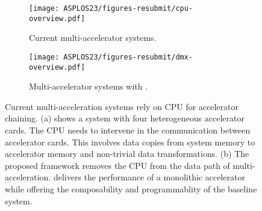 \begin{figure}[t]
\centering
\begin{subfigure}[b]{\columnwidth}
\texttt{[image: ASPLOS23/figures-resubmit/cpu-overview.pdf]}
\caption{Current multi-accelerator systems.}
\label{fig:overview:current}
\end{subfigure}
%
\hspace{0.5in}
\begin{subfigure}[b]{\columnwidth}
\texttt{[image: ASPLOS23/figures-resubmit/dmx-overview.pdf]}
\caption{Multi-accelerator systems with \dmx.}
\label{fig:overview:dmx}
\end{subfigure}
%
\caption{Current multi-acceleration systems rely on CPU for accelerator chaining. (a) shows a system with four heterogeneous accelerator cards. The CPU needs to intervene in the communication between accelerator cards. This involves data copies from system memory to accelerator memory and non-trivial data transformations. (b) The proposed \dmx framework removes the CPU from the data path of multi-acceleration. \dmx delivers the performance of a monolithic accelerator while offering the composability and programmablity of the baseline system.}
\vspace{-3ex}

\label{fig:overview}
\end{figure}

